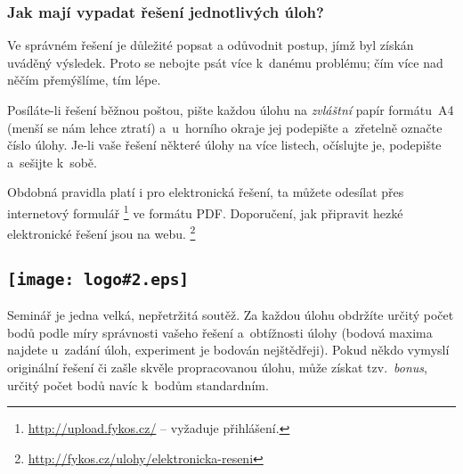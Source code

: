 \documentclass[fykos]{fksempty}
\newlength\logohead
\newcommand\nadpissptakemL[4]{\subsection[#1]{\texttt{[image: logo\#2.eps]} \addtolength{\logohead}{#3}\raisebox{\logohead}{#1}}}
\begin{document}

\subsubsection{Jak mají vypadat řešení jednotlivých úloh?}

Ve správném řešení je důležité popsat a odůvodnit postup,
jímž byl získán uváděný výsledek.
Proto se nebojte psát více k~danému problému; čím více nad něčím přemýšlíme, tím lépe.

Posíláte-li řešení běžnou poštou, pište každou úlohu na
\emph{zvláštní} papír formátu~A4 (menší se nám lehce ztratí)
a~u~horního okraje jej podepište a~zřetelně označte číslo úlohy.
Je-li vaše řešení některé úlohy na více listech, očíslujte je, 
podepište a~sešijte k~sobě.

Obdobná pravidla platí i pro elektronická řešení,
ta můžete odesílat přes internetový formulář%
\footnote{\url{http://upload.fykos.cz/} -- vyžaduje přihlášení.} ve formátu PDF.
Doporučení, jak připravit hezké elektronické řešení jsou na webu.%
\footnote{\url{http://fykos.cz/ulohy/elektronicka-reseni}}



\nadpissptakemL{Jak se {\FYKOS} vyhodnocuje?}{7}{6mm}{}

Seminář je jedna velká, nepřetržitá soutěž. Za každou úlohu
obdržíte určitý počet bodů podle míry správnosti vašeho řešení
a~obtížnosti úlohy (bodová maxima najdete u~zadání úloh, 
experiment je bodován nejštědřeji). Pokud někdo vymyslí 
originální řešení či zašle skvěle propracovanou úlohu, může 
získat tzv.~\emph{bonus}, určitý počet bodů navíc
k~bodům standardním.
\end{document}
